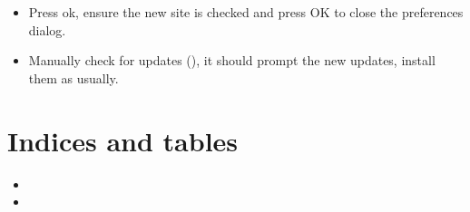 \documentclass[letterpaper,10pt,english]{sphinxmanual}
\begin{document}
\noindent{}
\begin{itemize}
\item {} 
Press ok, ensure the new site is checked and press OK to close the preferences dialog.

\end{itemize}

\noindent{}
\begin{itemize}
\item {} 
Manually check for updates (), it should prompt the new updates, install them as usually.

\end{itemize}


\chapter{Indices and tables}
\label{\detokenize{index:indices-and-tables}}\begin{itemize}
\item {} 

\item {} 

\end{itemize}



\renewcommand{\indexname}{Index}
\printindex
\end{document}
